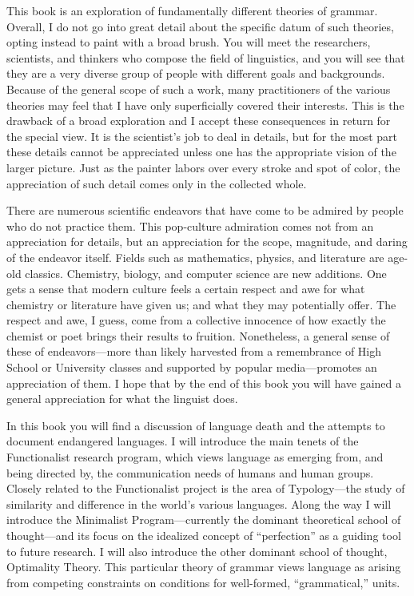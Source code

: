 \documentclass[11pt]{book}%
\theoremstyle{plain}
\numberwithin{equation}{section}
\theoremstyle{definition}
\newtheorem{phrase string}{Phrase String}
\begin{document}
This book is an exploration of fundamentally different theories of grammar. Overall, I do not go into great detail about the specific datum of such theories, opting instead to paint with a broad brush. You will meet the researchers, scientists, and thinkers who compose the field of linguistics, and you will see that they are a very diverse group of people with different goals and backgrounds. Because of the general scope of such a work, many practitioners of the various theories may feel that I have only superficially covered their interests. This is the drawback of a broad exploration and I accept these consequences in return for the special view. It is the scientist's job to deal in details, but for the most part these details cannot be appreciated unless one has the appropriate vision of the larger picture. Just as the painter labors over every stroke and spot of color, the appreciation of such detail comes only in the collected whole. 

There are numerous scientific endeavors that have come to be admired by people who do not practice them. This pop-culture admiration comes not from an appreciation for details, but an appreciation for the scope, magnitude, and daring of the endeavor itself. Fields such as mathematics, physics, and literature are age-old classics. Chemistry, biology, and computer science are new additions. One gets a sense that modern culture feels a certain respect and awe for what chemistry or literature have given us; and what they may potentially offer. The respect and awe, I guess, come from a collective innocence of how exactly the chemist or poet brings their results to fruition. Nonetheless, a general sense of these of endeavors---more than likely harvested from a remembrance of High School or University classes and supported by popular media---promotes an appreciation of them. I hope that by the end of this book you will have gained a general appreciation for what the linguist does.  

In this book you will find a discussion of language death and the attempts to document endangered languages. I will introduce the main tenets of the Functionalist research program, which views language as emerging from, and being directed by, the communication needs of humans and human groups. Closely related to the Functionalist project is the area of Typology---the study of similarity and difference in the world's various languages. Along the way I will introduce the Minimalist Program---currently the dominant theoretical school of thought---and its focus on the idealized concept of ``perfection'' as a guiding tool to future research. I will also introduce the other dominant school of thought, Optimality Theory. This particular theory of grammar views language as arising from competing constraints on conditions for well-formed, ``grammatical,'' units. 
\end{document}
